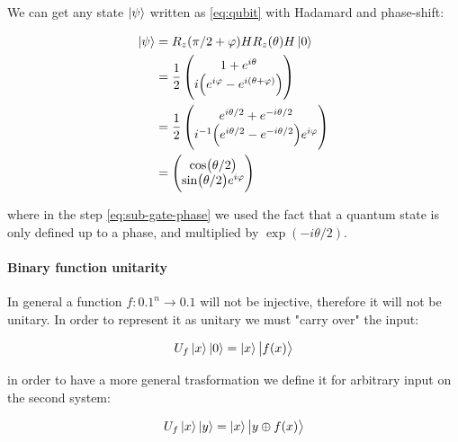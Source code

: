 \documentclass[main.tex]{subfiles}
\begin{document}
\begin{bluebox}
We can get any state \(\ket{\psi }\) written as \eqref{eq:qubit} with Hadamard and phase-shift:

\begin{subequations}
\begin{align}
  \ket{\psi }  &= R_z(\pi/2 + \varphi) H R_z(\theta) H\ket{0}  \\
  &= \frac{1}{2} \begin{pmatrix}
    1 + e^{i \theta} \\
     i  \qty(e^{i \varphi}  - e^{i (\theta + \varphi)})
  \end{pmatrix}  \\
  &= \label{eq:sub-gate-phase}
  \frac{1}{2} \begin{pmatrix}
    e^{i \theta /2} + e^{-i \theta /2} \\
    i^{-1} \qty(e^{i \theta/2} - e^{-i \theta/2}) e^{i \varphi}
\end{pmatrix}  \\
 &= \begin{pmatrix}
 \cos(\theta/2)  \\
 \sin(\theta/2) e^{i \varphi}
 \end{pmatrix}
\end{align}
\end{subequations}

where in the step \eqref{eq:sub-gate-phase} we used the fact that a quantum state is only defined up to a phase, and multiplied by \(\exp(-i \theta/2) \).
\end{bluebox}


\paragraph{Binary function unitarity}

In general a function \(f: \qty{0,1}^n \rightarrow \qty{0,1}\) will not be injective, therefore it will not be unitary. In order to represent it as unitary we must "carry over" the input:

\begin{equation}
    U_f \ket{x} \ket{0} = \ket{x} \ket{f(x)}
\end{equation}

in order to have a more general trasformation we define it for arbitrary input on the second system:

\begin{equation}
    U_f \ket{x} \ket{y} = \ket{x} \ket{y \oplus f(x)}
\end{equation}
\end{document}
